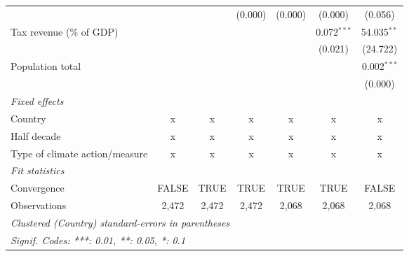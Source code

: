 \begin{tabular}{lcccccc}
                                                                     &                &                & (0.000)        & (0.000)        & (0.000)        & (0.056)\\   
   Tax revenue (\% of GDP)                                           &                &                &                &                & 0.072$^{***}$  & 54.035$^{**}$\\   
                                                                     &                &                &                &                & (0.021)        & (24.722)\\   
   Population total                                                  &                &                &                &                &                & 0.002$^{***}$\\   
                                                                     &                &                &                &                &                & (0.000)\\   
   \emph{Fixed effects}\\
   Country                                                           & x              & x              & x              & x              & x              & x\\  
   Half decade                                                       & x              & x              & x              & x              & x              & x\\  
   Type of climate action/measure                                    & x              & x              & x              & x              & x              & x\\  
   \midrule \emph{Fit statistics}\\
   Convergence                                                       &FALSE           & TRUE           & TRUE           & TRUE           & TRUE           & FALSE\\  
   Observations                                                      & 2,472          & 2,472          & 2,472          & 2,068          & 2,068          & 2,068\\  
   \midrule
   \multicolumn{7}{l}{\emph{Clustered (Country) standard-errors in parentheses}}\\
   \multicolumn{7}{l}{\emph{Signif. Codes: ***: 0.01, **: 0.05, *: 0.1}}\\
\end{tabular}
\par\endgroup


